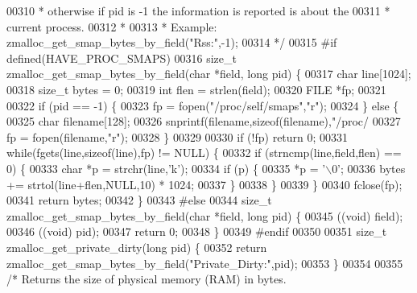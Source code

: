 \begin{DoxyCode}
{{00310 \textcolor{comment}{ * otherwise if pid is -1 the information is reported is about the}
00311 \textcolor{comment}{ * current process.}
00312 \textcolor{comment}{ *}
00313 \textcolor{comment}{ * Example: zmalloc\_get\_smap\_bytes\_by\_field("Rss:",-1);}
00314 \textcolor{comment}{ */}
00315 \textcolor{preprocessor}{#}\textcolor{preprocessor}{if} \textcolor{preprocessor}{defined}\textcolor{preprocessor}{(}HAVE\_PROC\_SMAPS\textcolor{preprocessor}{)}
00316 size\_t zmalloc\_get\_smap\_bytes\_by\_field(\textcolor{keywordtype}{char} *field, \textcolor{keywordtype}{long} pid) \{
00317     \textcolor{keywordtype}{char} line[1024];
00318     size\_t bytes = 0;
00319     \textcolor{keywordtype}{int} flen = strlen(field);
00320     FILE *fp;
00321 
00322     \textcolor{keywordflow}{if} (pid == -1) \{
00323         fp = fopen(\textcolor{stringliteral}{"/proc/self/smaps"},\textcolor{stringliteral}{"r"});
00324     \} \textcolor{keywordflow}{else} \{
00325         \textcolor{keywordtype}{char} filename[128];
00326         snprintf(filename,\textcolor{keyword}{sizeof}(filename),\textcolor{stringliteral}{"/proc/%
00327         fp = fopen(filename,\textcolor{stringliteral}{"r"});
00328     \}
00329 
00330     \textcolor{keywordflow}{if} (!fp) \textcolor{keywordflow}{return} 0;
00331     \textcolor{keywordflow}{while}(fgets(line,\textcolor{keyword}{sizeof}(line),fp) != NULL) \{
00332         \textcolor{keywordflow}{if} (strncmp(line,field,flen) == 0) \{
00333             \textcolor{keywordtype}{char} *p = strchr(line,\textcolor{stringliteral}{'k'});
00334             \textcolor{keywordflow}{if} (p) \{
00335                 *p = \textcolor{stringliteral}{'\(\backslash\)0'};
00336                 bytes += strtol(line+flen,NULL,10) * 1024;
00337             \}
00338         \}
00339     \}
00340     fclose(fp);
00341     \textcolor{keywordflow}{return} bytes;
00342 \}
00343 \textcolor{preprocessor}{#}\textcolor{preprocessor}{else}
00344 size\_t zmalloc\_get\_smap\_bytes\_by\_field(\textcolor{keywordtype}{char} *field, \textcolor{keywordtype}{long} pid) \{
00345     ((\textcolor{keywordtype}{void}) field);
00346     ((\textcolor{keywordtype}{void}) pid);
00347     \textcolor{keywordflow}{return} 0;
00348 \}
00349 \textcolor{preprocessor}{#}\textcolor{preprocessor}{endif}
00350 
00351 size\_t zmalloc\_get\_private\_dirty(\textcolor{keywordtype}{long} pid) \{
00352     \textcolor{keywordflow}{return} zmalloc\_get\_smap\_bytes\_by\_field(\textcolor{stringliteral}{"Private\_Dirty:"},pid);
00353 \}
00354 
00355 \textcolor{comment}{/* Returns the size of physical memory (RAM) in bytes.}
}}}
\end{DoxyCode}

